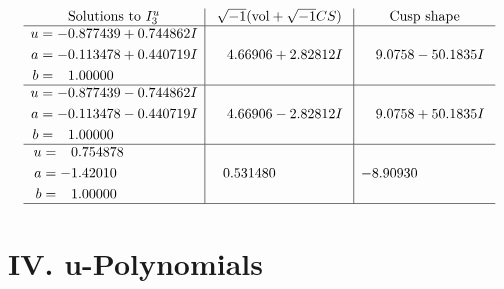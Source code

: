 \documentclass[1p]{elsarticle_modified}
\theoremstyle{definition}
\newcommand{\I}{\sqrt{-1}}
\begin{document}
$$\begin{array}{c|c|c}  
\text{Solutions to }I^u_{3}& \I (\text{vol} + \sqrt{-1}CS) & \text{Cusp shape}\\
 \hline 
\begin{aligned}
u &= -0.877439 + 0.744862 I \\
a &= -0.113478 + 0.440719 I \\
b &= \phantom{-}1.00000\phantom{ +0.000000I}\end{aligned}
 & \phantom{-}4.66906 + 2.82812 I & \phantom{-}9.0758 - 50.1835 I \\ \hline\begin{aligned}
u &= -0.877439 - 0.744862 I \\
a &= -0.113478 - 0.440719 I \\
b &= \phantom{-}1.00000\phantom{ +0.000000I}\end{aligned}
 & \phantom{-}4.66906 - 2.82812 I & \phantom{-}9.0758 + 50.1835 I \\ \hline\begin{aligned}
u &= \phantom{-}0.754878\phantom{ +0.000000I} \\
a &= -1.42010\phantom{ +0.000000I} \\
b &= \phantom{-}1.00000\phantom{ +0.000000I}\end{aligned}
 & \phantom{-}0.531480\phantom{ +0.000000I} & -8.90930\phantom{ +0.000000I}\\
 \hline 
 \end{array}$$\newpage
\newpage\renewcommand{\arraystretch}{1}
\centering \section*{ IV. u-Polynomials}
\end{document}
